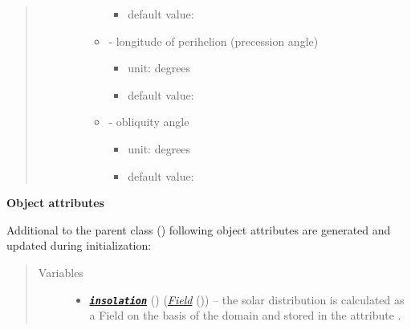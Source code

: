 \documentclass[a4paper,10pt,english]{sphinxmanual}
\begin{document}
\begin{fulllineitems}
\begin{quote}
\begin{description}
\begin{itemize}
\begin{itemize}
\begin{itemize}
\item {} 
default value: 

\end{itemize}

\item {} 
 - longitude of perihelion (precession angle)
\begin{itemize}
\item {} 
unit: degrees

\item {} 
default value: 

\end{itemize}

\item {} 
 - obliquity angle
\begin{itemize}
\item {} 
unit: degrees

\item {} 
default value: 

\end{itemize}

\end{itemize}


\end{itemize}

\end{description}\end{quote}

\textbf{Object attributes}

Additional to the parent class {\hyperref[api/climlab.radiation:climlab.radiation.insolation._Insolation]{\emph{}}} ()
following object attributes are generated and updated during initialization:
\begin{quote}\begin{description}
\item[{Variables}] \leavevmode\begin{itemize}
\item {} 
{\hyperref[api/climlab.radiation:module\string-climlab.radiation.insolation]{\emph{\textbf{\texttt{insolation}}}}} () ({\hyperref[api/climlab.domain:climlab.domain.field.Field]{\emph{\emph{Field}}}} ()) -- the solar distribution is calculated as a Field on 
the basis of the  domain
and stored in the attribute .


\end{itemize}
\end{description}
\end{quote}
\end{fulllineitems}
\end{document}
